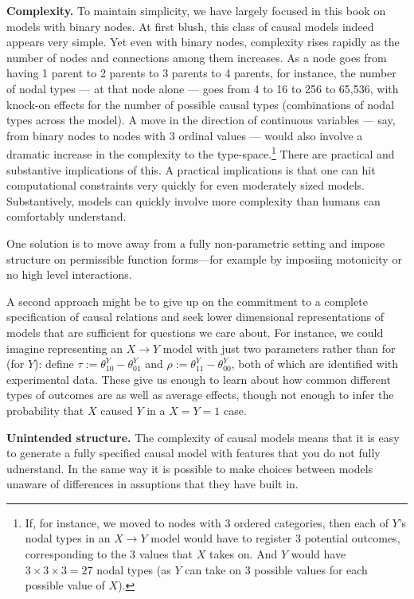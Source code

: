 \documentclass[
  12pt,
]{book}
\begin{document}
\textbf{Complexity.} To maintain simplicity, we have largely focused in this book on models with binary nodes. At first blush, this class of causal models indeed appears very simple. Yet even with binary nodes, complexity rises rapidly as the number of nodes and connections among them increases. As a node goes from having 1 parent to 2 parents to 3 parents to 4 parents, for instance, the number of nodal types --- at that node alone --- goes from 4 to 16 to 256 to 65,536, with knock-on effects for the number of possible causal types (combinations of nodal types across the model). A move in the direction of continuous variables --- say, from binary nodes to nodes with 3 ordinal values --- would also involve a dramatic increase in the complexity to the type-space.\footnote{If, for instance, we moved to nodes with 3 ordered categories, then each of \(Y\)'s nodal types in an \(X \rightarrow Y\) model would have to register 3 potential outcomes, corresponding to the 3 values that \(X\) takes on. And \(Y\) would have \(3 \times 3 \times 3 = 27\) nodal types (as \(Y\) can take on 3 possible values for each possible value of \(X\)).} There are practical and substantive implications of this. A practical implications is that one can hit computational constraints very quickly for even moderately sized models. Substantively, models can quickly involve more complexity than humans can comfortably understand.

One solution is to move away from a fully non-parametric setting and impose structure on permissible function forms---for example by imposiing motonicity or no high level interactions.

A second approach might be to give up on the commitment to a complete specification of causal relations and seek lower dimensional representations of models that are sufficient for questions we care about. For instance, we could imagine representing an \(X \rightarrow Y\) model with just two parameters rather than for (for \(Y\)): define \(\tau := \theta^Y_{10}-\theta^Y_{01}\) and \(\rho := \theta^Y_{11}-\theta^Y_{00}\), both of which are identified with experimental data. These give us enough to learn about how common different types of outcomes are as well as average effects, though not enough to infer the probability that \(X\) caused \(Y\) in a \(X=Y=1\) case.

\textbf{Unintended structure.} The complexity of causal models means that it is easy to generate a fully specified causal model with features that you do not fully udnerstand. In the same way it is possible to make choices between models unaware of differences in assuptions that they have built in.
\end{document}
